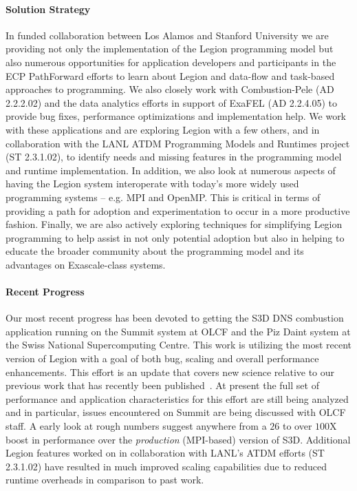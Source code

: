 \paragraph{Solution Strategy}
In funded collaboration between Los Alamos and Stanford University we are providing not
only the implementation of the Legion programming model but also numerous opportunities 
for application developers and participants in the ECP PathForward efforts to learn about 
Legion and data-flow and task-based approaches to programming.  We also closely work with
Combustion-Pele (AD 2.2.2.02) and the data analytics efforts in support of ExaFEL (AD 2.2.4.05)
to provide bug fixes, performance optimizations and implementation help.  We work with 
these applications and are exploring Legion with a few others, and in collaboration with 
the LANL ATDM Programming Models and Runtimes project (ST 2.3.1.02), to identify needs 
and missing features in the programming model and runtime implementation.  In addition, 
we also look at numerous aspects of having the Legion system interoperate with today's 
more widely used programming systems -- e.g. MPI and OpenMP.  This is critical in terms of
providing a path for adoption and experimentation to occur in a more productive fashion.
Finally, we are also actively exploring techniques for simplifying Legion programming to 
help assist in not only potential adoption but also in helping to educate the broader 
community about the programming model and its advantages on Exascale-class systems. 

\paragraph{Recent Progress}

Our most recent progress has been devoted to getting the S3D DNS combustion application 
running on the Summit system at OLCF and the Piz Daint system at the Swiss National 
Supercomputing Centre.  This work is utilizing the most recent version of Legion with a 
goal of both bug, scaling and overall performance enhancements.  This effort is an update
that covers new science relative to our previous work that has recently been 
published~\cite{Treichler:2017}.  At present the full set of performance and application
characteristics for this effort are still being analyzed and in particular, issues
encountered on Summit are being discussed with OLCF staff.  A early look at rough 
numbers suggest anywhere from a $26$ to over $100$X boost in performance over the 
\emph{production} (MPI-based) version of S3D.  Additional Legion features worked on in 
collaboration with LANL's ATDM efforts (ST 2.3.1.02) have resulted in much improved 
scaling capabilities due to reduced runtime overheads in comparison to past work.


